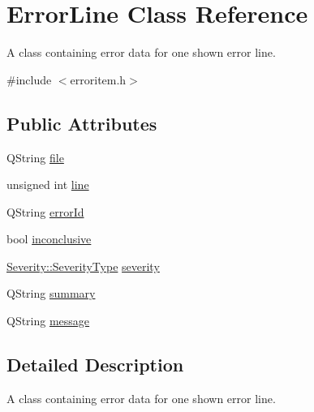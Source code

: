 \hypertarget{class_error_line}{\section{Error\-Line Class Reference}
\label{class_error_line}
}


A class containing error data for one shown error line.  




{\ttfamily \#include $<$erroritem.\-h$>$}

\subsection*{Public Attributes}
\begin{DoxyCompactItemize}
\item 
Q\-String \hyperlink{class_error_line_aaba8780c450ea7e40048a9e0160d9a25}{file}
\item 
unsigned int \hyperlink{class_error_line_a6d8990856137262870abaf23f024fa9f}{line}
\item 
Q\-String \hyperlink{class_error_line_a5c8472d2abe6f93e943a1d82db948259}{error\-Id}
\item 
bool \hyperlink{class_error_line_a05e996d063dccecc12e323b666d2bcd9}{inconclusive}
\item 
\hyperlink{class_severity_ac185938ae084355bbf1790cf1a70caa6}{Severity\-::\-Severity\-Type} \hyperlink{class_error_line_af3ac864f5147bba01d2aaccb6c890bfc}{severity}
\item 
Q\-String \hyperlink{class_error_line_aa1ecd5636cb14a74f016b1768e00aaf9}{summary}
\item 
Q\-String \hyperlink{class_error_line_ad45357a4430d5dfea406027938698802}{message}
\end{DoxyCompactItemize}


\subsection{Detailed Description}
A class containing error data for one shown error line. 

